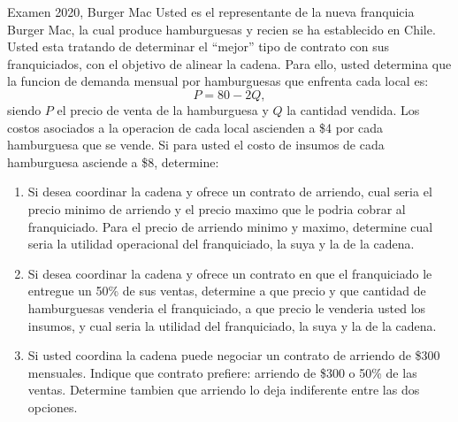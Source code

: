 \begin{enunciado}{Examen 2020, Burger Mac}
Usted es el representante de la nueva franquicia Burger Mac, la cual produce hamburguesas y recien se ha establecido en Chile. Usted esta tratando de determinar el ``mejor'' tipo de contrato con sus franquiciados, con el objetivo de alinear la cadena. Para ello, usted determina que la funcion de demanda mensual por hamburguesas que enfrenta cada local es:
\[
  P=80-2Q,
\]
siendo $P$ el precio de venta de la hamburguesa y $Q$ la cantidad vendida. Los costos asociados a la operacion de cada local ascienden a \$4 por cada hamburguesa que se vende. Si para usted el costo de insumos de cada hamburguesa asciende a \$8, determine:

\begin{enumerate}[label=\alph*)]
  \item Si desea coordinar la cadena y ofrece un contrato de arriendo, cual seria el precio minimo de arriendo y el precio maximo que le podria cobrar al franquiciado. Para el precio de arriendo minimo y maximo, determine cual seria la utilidad operacional del franquiciado, la suya y la de la cadena.
  \item Si desea coordinar la cadena y ofrece un contrato en que el franquiciado le entregue un 50\% de sus ventas, determine a que precio y que cantidad de hamburguesas venderia el franquiciado, a que precio le venderia usted los insumos, y cual seria la utilidad del franquiciado, la suya y la de la cadena.
  \item Si usted coordina la cadena puede negociar un contrato de arriendo de \$300 mensuales. Indique que contrato prefiere: arriendo de \$300 o 50\% de las ventas. Determine tambien que arriendo lo deja indiferente entre las dos opciones.
\end{enumerate}
\end{enunciado}

